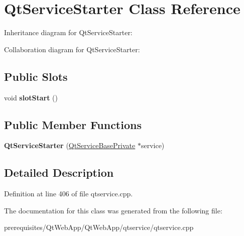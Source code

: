 \hypertarget{class_qt_service_starter}{}\section{Qt\+Service\+Starter Class Reference}
\label{class_qt_service_starter}


Inheritance diagram for Qt\+Service\+Starter\+:


Collaboration diagram for Qt\+Service\+Starter\+:
\subsection*{Public Slots}
\begin{DoxyCompactItemize}
\item 
\mbox{\label{class_qt_service_starter_adfd8ef0a999b55ca6eeefafee52cf8dc}} 
void {\bfseries slot\+Start} ()
\end{DoxyCompactItemize}
\subsection*{Public Member Functions}
\begin{DoxyCompactItemize}
\item 
\mbox{\label{class_qt_service_starter_ac192dd9044e8ff6a663a456d88e16fdc}} 
{\bfseries Qt\+Service\+Starter} (\mbox{\hyperlink{class_qt_service_base_private}{Qt\+Service\+Base\+Private}} $\ast$service)
\end{DoxyCompactItemize}


\subsection{Detailed Description}


Definition at line 406 of file qtservice.\+cpp.



The documentation for this class was generated from the following file\+:\begin{DoxyCompactItemize}
\item 
prerequisites/\+Qt\+Web\+App/\+Qt\+Web\+App/qtservice/qtservice.\+cpp\end{DoxyCompactItemize}
